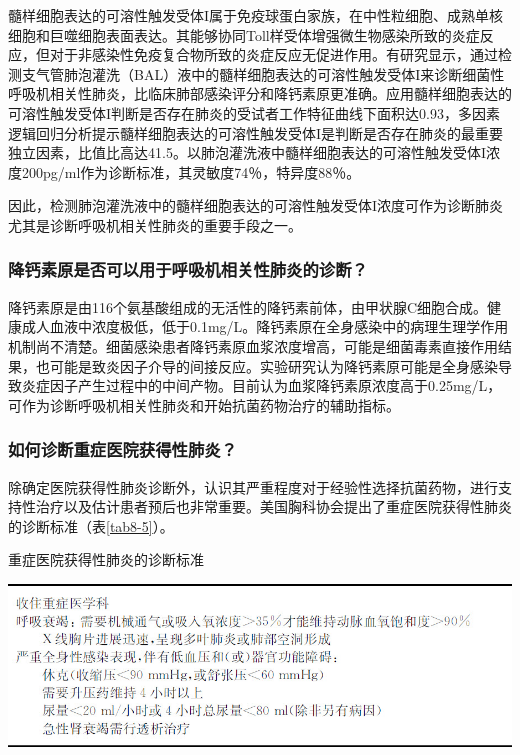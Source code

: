 髓样细胞表达的可溶性触发受体I属于免疫球蛋白家族，在中性粒细胞、成熟单核细胞和巨噬细胞表面表达。其能够协同Toll样受体增强微生物感染所致的炎症反应，但对于非感染性免疫复合物所致的炎症反应无促进作用。有研究显示，通过检测支气管肺泡灌洗（BAL）液中的髓样细胞表达的可溶性触发受体I来诊断细菌性呼吸机相关性肺炎，比临床肺部感染评分和降钙素原更准确。应用髓样细胞表达的可溶性触发受体I判断是否存在肺炎的受试者工作特征曲线下面积达0.93，多因素逻辑回归分析提示髓样细胞表达的可溶性触发受体I是判断是否存在肺炎的最重要独立因素，比值比高达41.5。以肺泡灌洗液中髓样细胞表达的可溶性触发受体I浓度200pg/ml作为诊断标准，其灵敏度74％，特异度88％。

因此，检测肺泡灌洗液中的髓样细胞表达的可溶性触发受体I浓度可作为诊断肺炎尤其是诊断呼吸机相关性肺炎的重要手段之一。

\subsubsection{降钙素原是否可以用于呼吸机相关性肺炎的诊断？}

降钙素原是由116个氨基酸组成的无活性的降钙素前体，由甲状腺C细胞合成。健康成人血液中浓度极低，低于0.1mg/L。降钙素原在全身感染中的病理生理学作用机制尚不清楚。细菌感染患者降钙素原血浆浓度增高，可能是细菌毒素直接作用结果，也可能是致炎因子介导的间接反应。实验研究认为降钙素原可能是全身感染导致炎症因子产生过程中的中间产物。目前认为血浆降钙素原浓度高于0.25mg/L，可作为诊断呼吸机相关性肺炎和开始抗菌药物治疗的辅助指标。

\subsubsection{如何诊断重症医院获得性肺炎？}

除确定医院获得性肺炎诊断外，认识其严重程度对于经验性选择抗菌药物，进行支持性治疗以及估计患者预后也非常重要。美国胸科协会提出了重症医院获得性肺炎的诊断标准（表\ref{tab8-5}）。

\begin{table}[htbp]
\centering
\caption{重症医院获得性肺炎的诊断标准}
\label{tab8-5}
\includegraphics{./images/Image00064.jpg}
\end{table}

